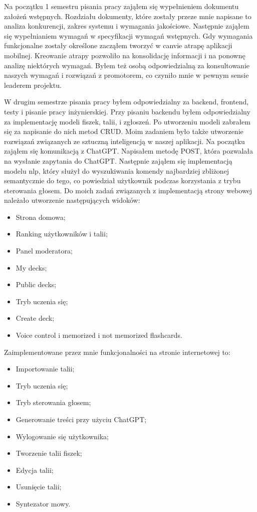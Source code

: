 Na początku 1 semestru pisania pracy zająłem się wypełnieniem dokumentu założeń wstępnych.
Rozdziału dokumenty, które zostały przeze mnie napisane to analiza konkurencji, zakres systemu i wymagania jakościowe.
Następnie zająłem się wypełnianiem wymagań w specyfikacji wymagań wstępnych.
Gdy wymagania funkcjonalne zostały określone zacząłem tworzyć w canvie atrapę aplikacji mobilnej.
Kreowanie atrapy pozwoliło na konsolidację informacji i na ponownę analizę niektórych wymagań.
Byłem też osobą odpowiedzialną za konsultowanie naszych wymagań i rozwiązań z promotorem, co czyniło mnie w pewnym
sensie leaderem projektu.
\par W drugim semestrze pisania pracy byłem odpowiedzialny za backend, frontend, testy i pisanie pracy
inżynierskiej. Przy pisaniu backendu byłem odpowiedzialny za implementację modeli fiszek, talii, i zgłoszeń.
Po utworzeniu modeli zabrałem się za napisanie do nich metod CRUD.
Moim zadaniem było także utworzenie rozwiązań związanych ze sztuczną inteligencją w naszej aplikacji.
Na początku zająłem się komunikacją z ChatGPT. Napisałem metodę POST, która pozwalała na wysłanie zapytania do ChatGPT.
Następnie zająłem się implementacją modelu nlp, który służył do wyszukiwania komendy najbardziej zbliżonej semantycznie
do tego, co powiedział użytkownik podczas korzystania z trybu sterowania głosem. Do moich zadań związanych z
implementacją strony webowej należało utworzenie następujących widoków:
\begin{itemize}
    \item Strona domowa;
    \item Ranking użytkowników i talii;
    \item Panel moderatora;
    \item My decks;
    \item Public decks;
    \item Tryb uczenia się;
    \item Create deck;
    \item Voice control i memorized i not memorized flashcards.
\end{itemize}

Zaimplementowane przez mnie funkcjonalności na stronie internetowej to:

\begin{itemize}
    \item Importowanie talii;
    \item Tryb uczenia się;
    \item Tryb sterowania głosem;
    \item Generowanie treści przy użyciu ChatGPT;
    \item Wylogowanie się użytkownika;
    \item Tworzenie talii fiszek;
    \item Edycja talii;
    \item Usunięcie talii;
    \item Syntezator mowy.
\end{itemize}

